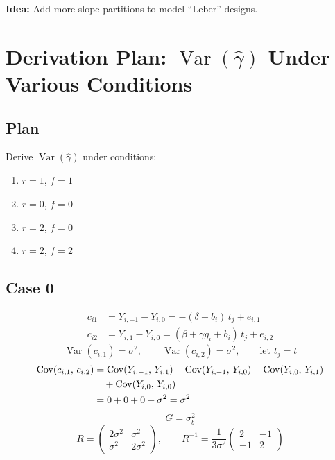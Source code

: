 \documentclass[11pt]{article}
\newcommand{\Var}{\operatorname{Var}}
\newcommand{\Cov}{\operatorname{Cov}}
\newcommand{\marginmark}[1]{%
  \begin{mdframed}[linewidth=0.5pt,innertopmargin=4pt,
    innerbottommargin=4pt]
  \small #1
  \end{mdframed}}
\begin{document}
\marginmark{%
  \textbf{Idea:} Add more slope partitions to model
  ``Leber'' designs.}


\newpage
\section{Derivation Plan: $\Var(\hat{\gamma})$ Under
  Various Conditions}

\subsection*{Plan}

Derive $\Var(\hat{\gamma})$ under conditions:
\begin{enumerate}[start=0]
  \item $r = 1$, $f = 1$
  \item $r = 0$, $f = 0$
  \item $r = 2$, $f = 0$
  \item $r = 2$, $f = 2$
\end{enumerate}

\subsection*{Case 0}

\begin{align}
  c_{i1} &= Y_{i,-1} - Y_{i,0}
    = -(\delta + b_i)\,t_j + e_{i,1} \\
  c_{i2} &= Y_{i,1} - Y_{i,0}
    = (\beta + \gamma g_i + b_i)\,t_j + e_{i,2}
\end{align}
\[
  \Var(c_{i,1}) = \sigma^2, \qquad
  \Var(c_{i,2}) = \sigma^2, \qquad
  \text{let } t_j = t
\]
\begin{align}
  \Cov(c_{i,1},\, c_{i,2})
  &= \Cov(Y_{i,-1},\, Y_{i,1})
    - \Cov(Y_{i,-1},\, Y_{i,0})
    - \Cov(Y_{i,0},\, Y_{i,1}) \notag \\
  &\quad + \Cov(Y_{i,0},\, Y_{i,0}) \notag \\
  &= 0 + 0 + 0 + \sigma^2 = \sigma^2
\end{align}
\[
  G = \sigma_b^2
\]
\begin{equation}
  R = \begin{pmatrix}
    2\sigma^2 & \sigma^2 \\
    \sigma^2 & 2\sigma^2
  \end{pmatrix}, \qquad
  R^{-1} = \frac{1}{3\sigma^2}
  \begin{pmatrix}
    2 & -1 \\ -1 & 2
  \end{pmatrix}
\end{equation}
\end{document}
